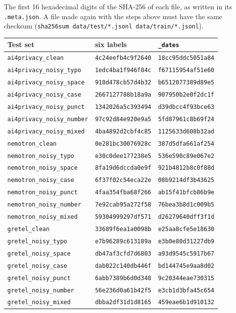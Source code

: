 \documentclass[10pt,a4paper]{article}
\newcommand{\file}[1]{\texttt{#1}}
\begin{document}
The first 16 hexadecimal digits of the SHA-256 of each file, as written in its \file{.meta.json}.
A file made again with the steps above must have the same checksum
(\file{sha256sum data/test/*.jsonl data/train/*.jsonl}).

\begin{center}
\small
\begin{tabular}{@{}lll@{}}
\toprule
Test set & six labels & \file{\_dates} \\
\midrule
\texttt{ai4privacy\_clean} & \texttt{4c24eefb4c9f2640} & \texttt{18cc95ddc5051a84} \\
\texttt{ai4privacy\_noisy\_typo} & \texttt{1edc4ba1f946f84c} & \texttt{f67115954af51e60} \\
\texttt{ai4privacy\_noisy\_space} & \texttt{910d478cb57d4b32} & \texttt{b6512077389d89e5} \\
\texttt{ai4privacy\_noisy\_case} & \texttt{2667127788b18a9a} & \texttt{907950b2e0f2dc1f} \\
\texttt{ai4privacy\_noisy\_punct} & \texttt{1342026a5c393494} & \texttt{d39dbcc4f93bce63} \\
\texttt{ai4privacy\_noisy\_number} & \texttt{97c92d84e920e9a5} & \texttt{5fd87961c8b69f24} \\
\texttt{ai4privacy\_noisy\_mixed} & \texttt{4ba4892d2cbf4c85} & \texttt{1125633d608b32ad} \\
\midrule
\texttt{nemotron\_clean} & \texttt{0e281bc30076928c} & \texttt{387d5dfa661af254} \\
\texttt{nemotron\_noisy\_typo} & \texttt{e30c0dee177238e5} & \texttt{536e590c89e067e2} \\
\texttt{nemotron\_noisy\_space} & \texttt{8fa19d6dccda0e9f} & \texttt{921b4812b8c0f88d} \\
\texttt{nemotron\_noisy\_case} & \texttt{6f37f02c54eca22e} & \texttt{08b9214df3b43625} \\
\texttt{nemotron\_noisy\_punct} & \texttt{4faa354fba68f266} & \texttt{ab15f41bfcb86b9e} \\
\texttt{nemotron\_noisy\_number} & \texttt{7e92cab95a272f58} & \texttt{76bea3b8d1c009b5} \\
\texttt{nemotron\_noisy\_mixed} & \texttt{59304999297df571} & \texttt{d26279640dff3f1d} \\
\midrule
\texttt{gretel\_clean} & \texttt{33689f6ea1a0098b} & \texttt{e25aa8cfe5e18630} \\
\texttt{gretel\_noisy\_typo} & \texttt{e7b96289c613189a} & \texttt{e3b0e80d31227db9} \\
\texttt{gretel\_noisy\_space} & \texttt{db47af3cfd7d6803} & \texttt{a93d9545c5917b67} \\
\texttt{gretel\_noisy\_case} & \texttt{dab022c140db446f} & \texttt{bd144745e9aa8d02} \\
\texttt{gretel\_noisy\_punct} & \texttt{6abb7389b6d0d348} & \texttt{9c20344eae730315} \\
\texttt{gretel\_noisy\_number} & \texttt{56e236d0a61b42f5} & \texttt{e3cb1d3bfa45c654} \\
\texttt{gretel\_noisy\_mixed} & \texttt{dbba2df31d1d8165} & \texttt{459eae6b1d910132} \\
\bottomrule
\end{tabular}


\end{center}
\end{document}
